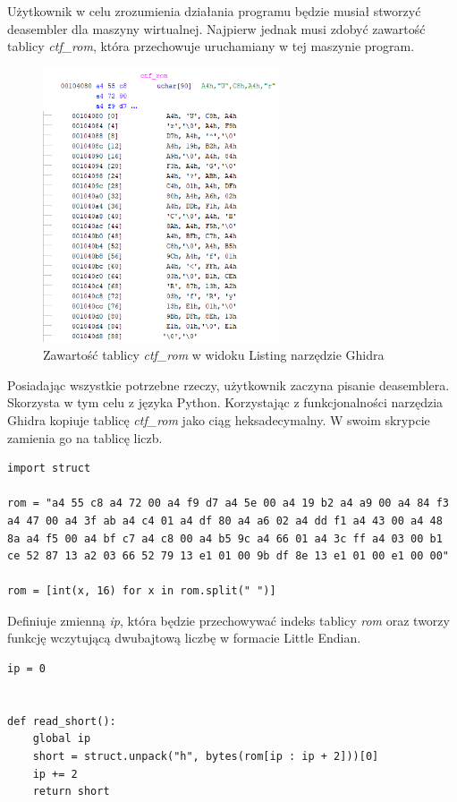 \documentclass[language=polish,type=eng]{aghmodern}
\begin{document}
\begin{appendices}
Użytkownik w celu zrozumienia działania programu będzie musiał stworzyć deasembler dla maszyny wirtualnej.
Najpierw jednak musi zdobyć zawartość tablicy \emph{ctf\_rom}, która przechowuje uruchamiany w tej maszynie program.

\begin{figure}[H]
\centering
\includegraphics[width=7cm]{600_rom}
\caption{Zawartość tablicy \emph{ctf\_rom} w widoku Listing narzędzie Ghidra}
\end{figure}

Posiadając wszystkie potrzebne rzeczy, użytkownik zaczyna pisanie deasemblera.
Skorzysta w tym celu z języka Python. Korzystając z funkcjonalności narzędzia Ghidra
kopiuje tablicę \emph{ctf\_rom} jako ciąg heksadecymalny. W swoim skrypcie
zamienia go na tablicę liczb.

\begin{verbatim}
import struct

rom = "a4 55 c8 a4 72 00 a4 f9 d7 a4 5e 00 a4 19 b2 a4 a9 00 a4 84 f3 a4 47 00 a4 3f ab a4 c4 01 a4 df 80 a4 a6 02 a4 dd f1 a4 43 00 a4 48 8a a4 f5 00 a4 bf c7 a4 c8 00 a4 b5 9c a4 66 01 a4 3c ff a4 03 00 b1 ce 52 87 13 a2 03 66 52 79 13 e1 01 00 9b df 8e 13 e1 01 00 e1 00 00"

rom = [int(x, 16) for x in rom.split(" ")]
\end{verbatim}

Definiuje zmienną \emph{ip}, która będzie przechowywać indeks tablicy \emph{rom} oraz tworzy
funkcję wczytującą dwubajtową liczbę w formacie Little Endian.

\begin{verbatim}
ip = 0


def read_short():
    global ip
    short = struct.unpack("h", bytes(rom[ip : ip + 2]))[0]
    ip += 2
    return short
\end{verbatim}


\end{appendices}
\end{document}
